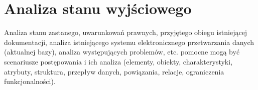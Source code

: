 \section{Analiza stanu wyjściowego}
Analiza stanu zastanego, uwarunkowań prawnych, przyjętego
obiegu istniejącej dokumentacji, analiza istniejącego systemu elektronicznego
przetwarzania danych (aktualnej bazy), analiza występujących problemów, etc. pomocne
mogą być scenariusze postępowania i ich analiza (elementy, obiekty, charakterystyki,
atrybuty, struktura, przepływ danych, powiązania, relacje, ograniczenia funkcjonalności).
